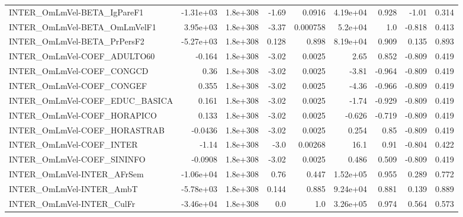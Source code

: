 \begin{tabular}{lrrrrrrrr}
INTER\_OmLmVel-BETA\_IgPareF1           &   -1.31e+03 &     1.8e+308 &   -1.69 &   0.0916 &   4.19e+04 &       0.928 &        -1.01 &         0.314 \\
INTER\_OmLmVel-BETA\_OmLmVelF1          &    3.95e+03 &     1.8e+308 &   -3.37 & 0.000758 &    5.2e+04 &         1.0 &       -0.818 &         0.413 \\
INTER\_OmLmVel-BETA\_PrPersF2           &   -5.27e+03 &     1.8e+308 &   0.128 &    0.898 &   8.19e+04 &       0.909 &        0.135 &         0.893 \\
INTER\_OmLmVel-COEF\_ADULTO60           &      -0.164 &     1.8e+308 &   -3.02 &   0.0025 &       2.65 &       0.852 &       -0.809 &         0.419 \\
INTER\_OmLmVel-COEF\_CONGCD             &        0.36 &     1.8e+308 &   -3.02 &   0.0025 &      -3.81 &      -0.964 &       -0.809 &         0.419 \\
INTER\_OmLmVel-COEF\_CONGEF             &       0.355 &     1.8e+308 &   -3.02 &   0.0025 &      -4.36 &      -0.966 &       -0.809 &         0.419 \\
INTER\_OmLmVel-COEF\_EDUC\_BASICA        &       0.161 &     1.8e+308 &   -3.02 &   0.0025 &      -1.74 &      -0.929 &       -0.809 &         0.419 \\
INTER\_OmLmVel-COEF\_HORAPICO           &       0.133 &     1.8e+308 &   -3.02 &   0.0025 &     -0.626 &      -0.719 &       -0.809 &         0.419 \\
INTER\_OmLmVel-COEF\_HORASTRAB          &     -0.0436 &     1.8e+308 &   -3.02 &   0.0025 &      0.254 &        0.85 &       -0.809 &         0.419 \\
INTER\_OmLmVel-COEF\_INTER              &       -1.14 &     1.8e+308 &    -3.0 &  0.00268 &       16.1 &        0.91 &       -0.804 &         0.422 \\
INTER\_OmLmVel-COEF\_SININFO            &     -0.0908 &     1.8e+308 &   -3.02 &   0.0025 &      0.486 &       0.509 &       -0.809 &         0.419 \\
INTER\_OmLmVel-INTER\_AFrSem            &   -1.06e+04 &     1.8e+308 &    0.76 &    0.447 &   1.52e+05 &       0.955 &        0.289 &         0.772 \\
INTER\_OmLmVel-INTER\_AmbT              &   -5.78e+03 &     1.8e+308 &   0.144 &    0.885 &   9.24e+04 &       0.881 &        0.139 &         0.889 \\
INTER\_OmLmVel-INTER\_CulFr             &   -3.46e+04 &     1.8e+308 &     0.0 &      1.0 &   3.26e+05 &       0.974 &        0.564 &         0.573 \\

\end{tabular}
